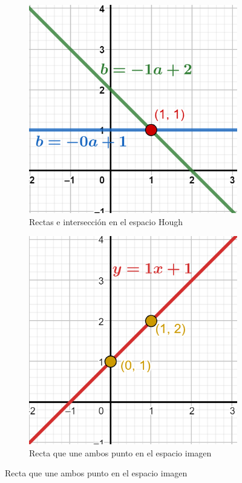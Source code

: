 \begin{figure}
\begin{subfigure}[b]{0.3\textwidth}
        \includegraphics[width=\textwidth]{imaxes/c-bases-teoricas/hough-2}
        \caption{Rectas e intersección en el espacio Hough}
        \label{fig:hough-intersection}
    \end{subfigure}
    \hfill
    \begin{subfigure}[b]{0.3\textwidth}
        \centering
        \includegraphics[width=\textwidth]{imaxes/c-bases-teoricas/hough-3}
        \caption{Recta que une ambos punto en el espacio imagen}
        \label{fig:hough-recta-a-b}
    \end{subfigure}
\end{figure}

